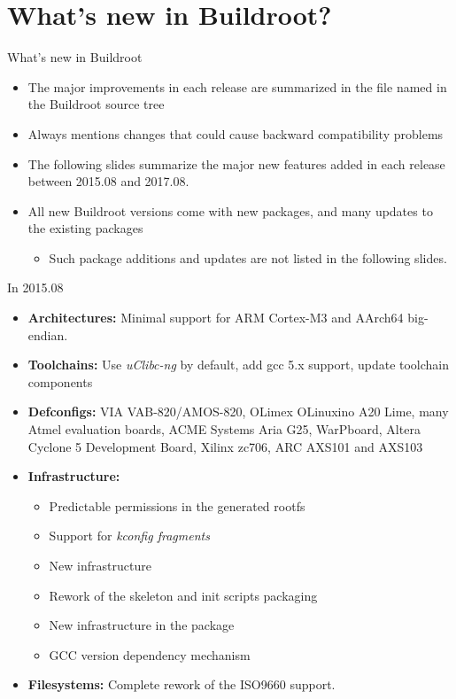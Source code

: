 \section{What's new in Buildroot?}

\begin{frame}{What's new in Buildroot}
  \begin{itemize}
  \item The major improvements in each release are summarized in the
    file named  in the Buildroot source tree
  \item Always mentions changes that could cause backward
    compatibility problems
  \item The following slides summarize the major new features added in
    each release between 2015.08 and 2017.08.
  \item All new Buildroot versions come with new packages, and many
    updates to the existing packages
    \begin{itemize}
    \item Such package additions and updates are not listed in the
      following slides.
    \end{itemize}
  \end{itemize}
\end{frame}

\begin{frame}{In 2015.08}
  \begin{itemize}
  \item {\bf Architectures:} Minimal support for ARM Cortex-M3 and
    AArch64 big-endian.
  \item {\bf Toolchains:} Use {\em uClibc-ng} by default, add gcc 5.x
    support, update toolchain components
  \item {\bf Defconfigs:} VIA VAB-820/AMOS-820, OLimex OLinuxino A20
    Lime, many Atmel evaluation boards, ACME Systems Aria G25,
    WarPboard, Altera Cyclone 5 Development Board, Xilinx zc706, ARC
    AXS101 and AXS103
  \item {\bf Infrastructure:}
    \begin{itemize}
    \item Predictable permissions in the generated rootfs
    \item Support for {\em kconfig fragments}
    \item New  infrastructure
    \item Rework of the skeleton and init scripts packaging
    \item New  infrastructure in the 
      package
    \item GCC version dependency mechanism
    \end{itemize}
  \item {\bf Filesystems:} Complete rework of the ISO9660 support.
  \end{itemize}
\end{frame}

